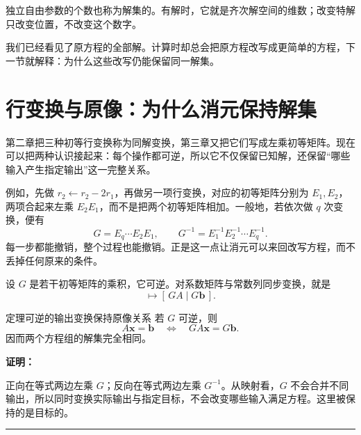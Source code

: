 \documentclass[a4paper,12pt,twoside,openany,fontset=none]{ctexbook}
\newcounter{theorem}[chapter]
\newenvironment{theorem}[1][]{\begin{thmBox}{定理}{#1}}{\end{thmBox}}
\renewenvironment{proof}{
    \par\vspace{0.5em}\noindent
    \textbf{\color{LogicColor} 证明：}
}{
    \hfill \textcolor{LogicColor}{\rule{0.6em}{0.6em}} \par
}
\numberwithin{equation}{chapter}
\begin{document}
独立自由参数的个数也称为解集的。有解时，它就是齐次解空间的维数；改变特解只改变位置，不改变这个数字。

我们已经看见了原方程的全部解。计算时却总会把原方程改写成更简单的方程，下一节就解释：为什么这些改写仍能保留同一解集。

\section{行变换与原像：为什么消元保持解集}
\label{sec:five-row-preimage}

第二章把三种初等行变换称为同解变换，第三章又把它们写成左乘初等矩阵。现在可以把两种认识接起来：每个操作都可逆，所以它不仅保留已知解，还保留“哪些输入产生指定输出”这一完整关系。

例如，先做 $r_2\leftarrow r_2-2r_1$，再做另一项行变换，对应的初等矩阵分别为 $E_1,E_2$，两项合起来左乘 $E_2E_1$，而不是把两个初等矩阵相加。一般地，若依次做 $q$ 次变换，便有
\begin{equation}
 G=E_q\cdots E_2E_1,\qquad
 G^{-1}=E_1^{-1}E_2^{-1}\cdots E_q^{-1}.
\end{equation}
每一步都能撤销，整个过程也能撤销。正是这一点让消元可以来回改写方程，而不丢掉任何原来的条件。

设 $G$ 是若干初等矩阵的乘积，它可逆。对系数矩阵与常数列同步变换，就是
\begin{equation}
 [\,A\mid\boldsymbol b\,]\longmapsto[\,GA\mid G\boldsymbol b\,].
\end{equation}
\begin{theorem}[可逆的输出变换保持原像关系]
若 $G$ 可逆，则
\begin{equation}
 A\boldsymbol x=\boldsymbol b
 \quad\Longleftrightarrow\quad
 GA\boldsymbol x=G\boldsymbol b.
\end{equation}
因而两个方程组的解集完全相同。
\end{theorem}
\begin{proof}
正向在等式两边左乘 $G$；反向在等式两边左乘 $G^{-1}$。从映射看，$G$ 不会合并不同输出，所以同时变换实际输出与指定目标，不会改变哪些输入满足方程。这里被保持的是目标的。
\end{proof}
\end{document}
